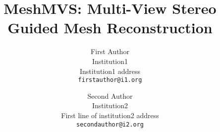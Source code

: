 \documentclass[10pt,twocolumn,letterpaper]{article}
\begin{document}
\title{MeshMVS: Multi-View Stereo Guided Mesh Reconstruction}

\author{First Author\\
Institution1\\
Institution1 address\\
{\tt\small firstauthor@i1.org}
\and
Second Author\\
Institution2\\
First line of institution2 address\\
{\tt\small secondauthor@i2.org}
}

\maketitle
\ificcvfinal\thispagestyle{empty}\fi

\newcommand{\todo}[1]{{\textcolor{red}{\bf [#1]}}}

\newcommand{\figref}[1]{Figure~\ref{fig:#1}}
\newcommand{\tabref}[1]{Table~\ref{tab:#1}}
\newcommand{\equref}[1]{Equation~(\ref{equ:#1})}
\newcommand{\secref}[1]{Section~\ref{sec:#1}}
\newcommand{\subsecref}[1]{Sub-section~\ref{subsec:#1}}
\newcommand{\tableref}[1]{Table~\ref{table:#1}}








{\small


}
\end{document}
